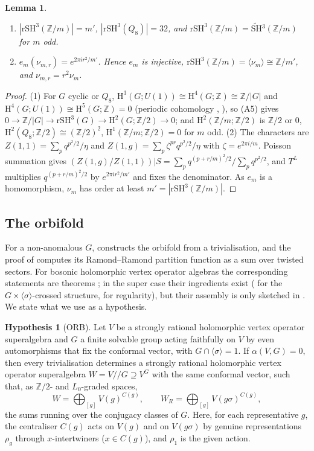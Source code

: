 \documentclass[11pt]{amsart}
\newtheorem{lemma}[theorem]{Lemma}
\theoremstyle{definition}
\newtheorem{hypothesis}[theorem]{Hypothesis}
\newcommand{\Z}{\mathbb{Z}}
\newcommand{\SH}{\widetilde{\mathrm{SH}}{}^3}
\newcommand{\rSH}{\mathrm{rSH}^3}
\newcommand{\Hc}{\mathrm{H}}
\newcommand{\orb}{/\!\!/}
\begin{document}
\begin{lemma}\label{lem:calib}
\begin{enumerate}
\item $|\rSH(\Z/m)|=m'$, $|\rSH(Q_8)|=32$, and $\rSH(\Z/m)=\SH(\Z/m)$ for $m$ odd.
\item $e_m(\nu_{m,r})=e^{2\pi ir^2/m'}$. Hence $e_m$ is injective, $\rSH(\Z/m)=\langle\nu_m\rangle\cong
  \Z/m'$, and $\nu_{m,r}=r^2\nu_m$.
\end{enumerate}
\end{lemma}

\begin{proof}
(1) For $G$ cyclic or $Q_8$, $\Hc^3(G;U(1))\cong\Hc^4(G;\Z)\cong\Z/|G|$ and $\Hc^4(G;U(1))\cong
\Hc^5(G;\Z)=0$ (periodic cohomology \cite[XII.7]{CE}, \cite[VI.9]{Brown}), so (A5) gives
$0\to\Z/|G|\to\rSH(G)\to\Hc^2(G;\Z/2)\to0$; and $\Hc^2(\Z/m;\Z/2)$ is $\Z/2$ or $0$, $\Hc^2(Q_8;\Z/2)\cong
(\Z/2)^2$, $\Hc^1(\Z/m;\Z/2)=0$ for $m$ odd. (2) The characters are $Z(1,1)=\sum_pq^{p^2/2}/\eta$ and
$Z(1,g)=\sum_p\zeta^{pr}q^{p^2/2}/\eta$ with $\zeta=e^{2\pi i/m}$. Poisson summation gives
$(Z(1,g)/Z(1,1))|S=\sum_pq^{(p+r/m)^2/2}/\sum_pq^{p^2/2}$, and $T^L$ multiplies $q^{(p+r/m)^2/2}$ by
$e^{2\pi ir^2/m'}$ and fixes the denominator. As $e_m$ is a homomorphism, $\nu_m$ has order at least
$m'=|\rSH(\Z/m)|$.
\end{proof}

\subsection{The orbifold}\label{sec:orb}
For a non-anomalous $G$, \cite[Thm.~4.2]{GJF} constructs the orbifold from a trivialisation, and the
proof of \cite[Thm.~5.6]{GJF} computes its Ramond--Ramond partition function as a sum over twisted
sectors. For bosonic holomorphic vertex operator algebras the corresponding statements are theorems
\cite{Kirillov,DNR,McRae}; in the super case their ingredients exist (\cite[Thms.~4.15,
4.17]{McRae} for the $G\times\langle\sigma\rangle$-crossed structure, \cite{CM} for regularity), but
their assembly is only sketched in \cite{GJF}. We state what we use as a hypothesis.

\begin{hypothesis}[ORB]\label{hyp:orb}
Let $V$ be a strongly rational holomorphic vertex operator superalgebra and $G$ a finite solvable group
acting faithfully on $V$ by even automorphisms that fix the conformal vector, with
$G\cap\langle\sigma\rangle=1$. If $\alpha(V,G)=0$, then every trivialisation determines a strongly
rational holomorphic vertex operator superalgebra $W=V\orb G\supseteq V^G$ with the same conformal
vector, such that, as $\Z/2$- and $L_0$-graded spaces,
\[
  W=\bigoplus_{[g]}V(g)^{C(g)},\qquad W_R=\bigoplus_{[g]}V(g\sigma)^{C(g)},
\]
the sums running over the conjugacy classes of $G$. Here, for each representative $g$, the centraliser
$C(g)$ acts on $V(g)$ and on $V(g\sigma)$ by genuine representations $\rho_g$ through $x$-intertwiners
($x\in C(g)$), and $\rho_1$ is the given action.
\end{hypothesis}
\end{document}
